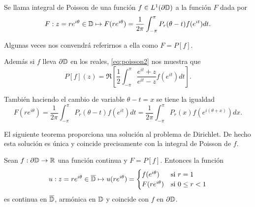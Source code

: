 \begin{definition}
    Se llama integral de Poisson de una función $f \in L^1(\partial \mathbb{D})$ a la función $F$ dada por
    \begin{equation*}
        F: z=re^{i \theta} \in \mathbb{D} \mapsto F(re^{i \theta}) = \dfrac{1}{2 \pi} \int_{- \pi}^{\pi} P_r (\theta - t) f(e^{it}) dt.
    \end{equation*}

    Algunas veces nos convendrá referirnos a ella como $F = P[f]$.
\end{definition}

Además si $f$ lleva $\partial \mathbb{D}$ en los reales, \eqref{eq:poisson2} nos muestra que %
\begin{equation*}
    P[f](z) = \Re \left[ \dfrac{1}{2} \int_{-\pi}^{\pi} \dfrac{e^{it} + z}{e^{it} - z} f(e^{it}) dt \right].
\end{equation*}

También haciendo el cambio de variable $\theta - t = x$ se tiene la igualdad
\begin{equation*}
    F(re^{i \theta}) = \dfrac{1}{2 \pi} \int_{- \pi}^{\pi} P_r (\theta - t) f(e^{it}) dt = \dfrac{1}{2 \pi} \int_{- \pi}^{\pi} P_r (x) f(e^{i(\theta + x)}) dx.
\end{equation*}

El siguiente teorema proporciona una solución al problema de Dirichlet. De hecho esta solución es única y coincide precisamente con la integral de Poisson de $f$. \\

\begin{theorem} %
    \label{th:fatouaux2}
    Sean $f:\partial \mathbb{D} \to \mathbb{R}$ una función continua y $F = P[f]$. Entonces la función
    \begin{equation*}
        u : z = re^{i \theta} \in \overline{\mathbb{D}} \mapsto u(re^{i \theta}) =
        \begin{cases}
            f(e^{i\theta}) & \text{si } r=1 \\
            F(re^{i\theta}) & \text{si } 0 \leq r<1
        \end{cases}
    \end{equation*}
    es continua en $\overline{\mathbb{D}}$, armónica en $\mathbb{D}$ y coincide con $f$ en $\partial \mathbb{D}$.
\end{theorem}

